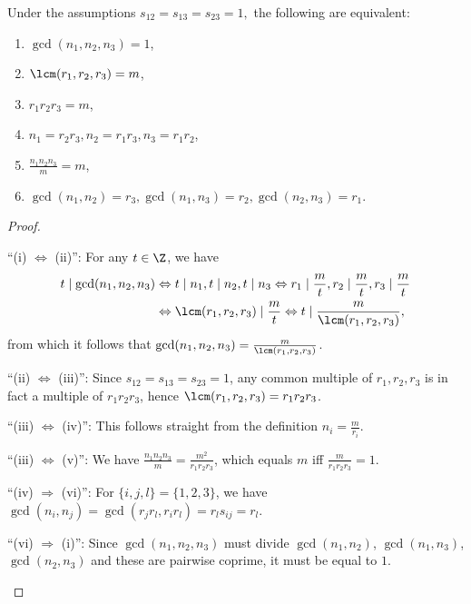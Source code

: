 \begin{lemma}\label{TFAE5}
Under the assumptions $s_{12}=s_{13}=s_{23}=1,$ the following are equivalent:
\begin{enumerate}[label={\upshape(\roman*)}]
\item $\gcd(n_1,n_2,n_3)=1$,
\item $\lcm(r_1,r_2,r_3)=m$,
\item $r_1r_2r_3=m$,
\item $n_1=r_2r_3, n_2=r_1r_3, n_3=r_1r_2$,
\item $\frac{n_1n_2n_3}{m}=m$,
\item $\gcd(n_1,n_2)=r_3, \gcd(n_1,n_3)=r_2, \gcd(n_2,n_3)=r_1$.
\end{enumerate}
\end{lemma}
\begin{proof}
\leavevmode
\begin{DESCRIPTION}%
\item[\enquote{(i) $\Leftrightarrow$ (ii)}:] For any $t\in\Z$, we have
\begin{align*}
t \mid \gcd(n_1,n_2,n_3) &\Leftrightarrow t \mid n_1, t\mid n_2, t\mid n_3 \Leftrightarrow r_1\mid \frac{m}{t}, r_2\mid \frac{m}{t}, r_3\mid \frac{m}{t} \\&\Leftrightarrow \lcm(r_1,r_2,r_3)\mid \frac{m}{t} \Leftrightarrow t \mid \frac{m}{ \lcm(r_1,r_2,r_3)},
\end{align*}
from which it follows that $ \gcd(n_1,n_2,n_3)=\frac{m}{ \lcm(r_1,r_2,r_3)}$.
\item[\enquote{(ii) $\Leftrightarrow$ (iii)}:]   Since $s_{12}=s_{13}=s_{23}=1$, any common multiple of $r_1,r_2,r_3$ is in fact a multiple of $r_1r_2r_3$, hence $\lcm(r_1,r_2,r_3)=r_1r_2r_3$.
\item[\enquote{(iii) $\Leftrightarrow$ (iv)}:] This follows straight from the definition $n_i=\frac{m}{r_i}$.
\item[\enquote{(iii) $\Leftrightarrow$ (v)}:] We have $\frac{n_1n_2n_3}{m}=\frac{m^2}{r_1r_2r_3}$, which equals $m$ iff $\frac{m}{r_1r_2r_3}=1$.
\item[\enquote{(iv) $\Rightarrow$ (vi)}:] For $\{i,j,l\}=\{1,2,3\}$, we have $\gcd(n_i,n_j)=\gcd(r_jr_l,r_ir_l)=r_ls_{ij}=r_l$.
\item[\enquote{(vi) $\Rightarrow$ (i)}:] Since $\gcd(n_1,n_2,n_3)$ must divide $\gcd(n_1,n_2)$, $\gcd(n_1,n_3)$, $\gcd(n_2,n_3)$ and these are pairwise coprime, it must be equal to $1$.
\end{DESCRIPTION}
\end{proof}

